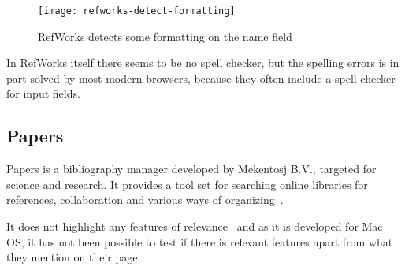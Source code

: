 \begin{figure}
    \centering
    \texttt{[image: refworks-detect-formatting]}
    \caption{RefWorks detects some formatting on the name field}
    \label{fig:refworks-detect-formatting}
\end{figure}

In RefWorks itself there seems to be no spell checker, but the
spelling errors is in part solved by most modern browsers, because
they often include a spell checker for input fields.

\subsection{Papers}
Papers is a bibliography manager developed by Mekentosj B.V., targeted
for science and research.  It provides a tool set for searching online
libraries for references, collaboration and various ways of
organizing~\cite{papers_features}.

It does not highlight any features of relevance~\cite{papers_features}
and as it is developed for Mac OS, it has not been possible to test if
there is relevant features apart from what they mention on their page.





